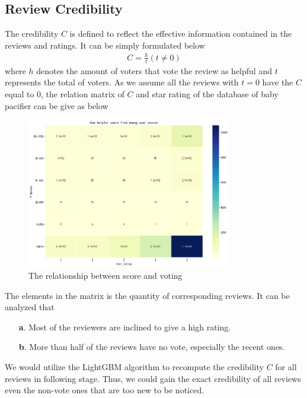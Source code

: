 \documentclass[12pt]{article}%
\begin{document}
\subsection{Review Credibility}
The credibility $C$ is defined to reflect the effective information contained in the reviews and ratings. It can be simply formulated below 
\begin{gather}
C=\frac{h}{t} (t\neq 0)
\end{gather}
where $h$ denotes the amount of voters that vote the review as helpful and $t$ represents the total of voters. As we assume all the reviews with $t=0$ have the $C$ equal to $0$, the relation matrix of $C$ and star rating of the database of baby pacifier can be give as below 
\begin{figure}[H]
\centering
\includegraphics[width=0.8\textwidth]{Upvote.png}%

\caption{The relationship between score and voting}\label{llssll}%
\end{figure}
The elements in the matrix is the quantity of corresponding reviews. It can be analyzed that 
\begin{itemize} 
	\item  [\textbf{a}.] Most of the reviewers are inclined to give a high rating.
	\item  [\textbf{b}.] More than half of the reviews have no vote, especially the recent ones.
\end{itemize}
We would utilize the LightGBM algorithm to recompute the credibility $C$ for all reviews in following stage. Thus, we could gain the exact credibility of all reviews even the non-vote ones that are too new to be noticed.
\end{document}
